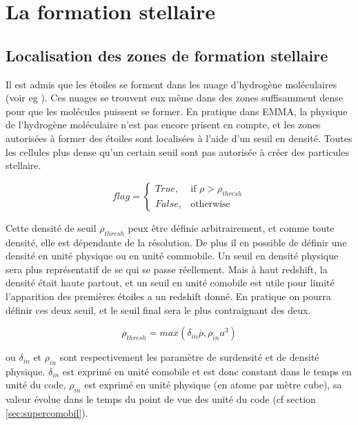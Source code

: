 \clearpage
\section{La formation stellaire}

\subsection{Localisation des zones de formation stellaire}

Il est admis que les étoiles se forment dans les nuage d'hydrogène moléculaires (voir eg \cite{krumholz_universal_2012}).
Ces nuages se trouvent eux même dans des zones suffisamment dense pour que les molécules puissent se former.
En pratique dans EMMA, la physique de l'hydrogène moléculaire n'est pas encore prisent en compte, et les zones autorisées à former des étoiles sont localisées à l'aide d'un seuil en densité.
Toutes les cellules plus dense qu'un certain seuil sont pas autorisée à créer des particules stellaire.

\begin{equation}
	flag = 
  \begin{cases}
      True, & \text{if } \rho > \rho_{thresh}\\
      False,              & \text{otherwise}
  \end{cases}
\end{equation} 

Cette densité de seuil $\rho_{thresh}$ peux être définie arbitrairement, et comme toute densité, elle est dépendante de la résolution.
De plus il en possible de définir une densité en unité physique ou en unité commobile.
Un seuil en densité physique sera plus représentatif de se qui se passe réellement.
Mais à haut redshift, la densité était haute partout, et un seuil en unité comobile est utile pour limité l'apparition des premières étoiles a un redshift donné.
En pratique on pourra définir ces deux seuil, et le seuil final sera le plus contraignant des deux.


\begin{equation}
	\rho_{thresh} = max\left(  \delta_{in} \bar{\rho}, \rho_{in} a^3 \right)
\end{equation} 

ou $\delta_{in}$ et $\rho_{in}$  sont respectivement les paramètre de surdensité et de densité physique.
$\delta_{in}$ est exprimé en unité comobile et est donc constant dans le temps en unité du code,
 $\rho_{in}$ est exprimé en unité physique (en atome par mètre cube), sa valeur évolue dans le temps du point de vue des unité du code (cf section \ref{sec:supercomobil}).

